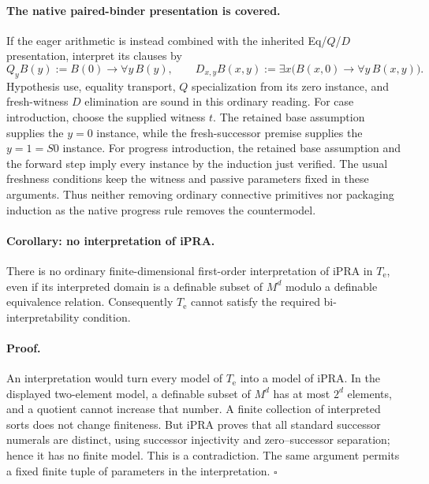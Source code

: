 \documentclass[11pt,letterpaper]{article}
\theoremstyle{definition}\newtheorem{definition}[theorem]{Definition}
\theoremstyle{remark}\newtheorem{remark}[theorem]{Remark}
\begin{document}
\paragraph{The native paired-binder presentation is covered.}
If the eager arithmetic is instead combined with the inherited
Eq/$Q$/$D$ presentation, interpret its clauses by
\[
 Q_yB(y):=B(0)\to\forall y\,B(y),\qquad
 D_{x,y}B(x,y):=\exists x\bigl(B(x,0)\to\forall y\,B(x,y)\bigr).
\]
Hypothesis use, equality transport, $Q$ specialization from its zero
instance, and fresh-witness $D$ elimination are sound in this ordinary
reading.  For case introduction, choose the supplied witness $t$.
The retained base assumption supplies the $y=0$ instance, while the
fresh-successor premise supplies the $y=1=S0$ instance.  For progress
introduction, the retained base assumption and the forward step imply
every instance by the induction just verified.  The usual freshness
conditions keep the witness and passive parameters fixed in these
arguments.  Thus neither removing ordinary connective primitives nor
packaging induction as the native progress rule removes the countermodel.

\paragraph{Corollary: no interpretation of iPRA.}
There is no ordinary finite-dimensional first-order interpretation of
iPRA in $T_{\mathrm e}$, even if its interpreted domain is a definable
subset of $M^d$ modulo a definable equivalence relation.  Consequently
$T_{\mathrm e}$ cannot satisfy the required bi-interpretability condition.

\paragraph{Proof.}
An interpretation would turn every model of $T_{\mathrm e}$ into a model
of iPRA.  In the displayed two-element model, a definable subset of $M^d$
has at most $2^d$ elements, and a quotient cannot increase that number.
A finite collection of interpreted sorts does not change finiteness.
But iPRA proves that all standard successor numerals are distinct, using
successor injectivity and zero--successor separation; hence it has no
finite model.  This is a contradiction.  The same argument permits a
fixed finite tuple of parameters in the interpretation.
\hfill$\square$
\end{document}
